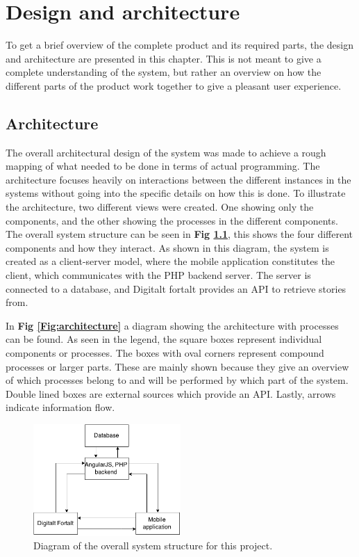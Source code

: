 
\chapter{Design and architecture}

To get a brief overview of the complete product and its required parts, the design and architecture are presented in this chapter. This is not meant to give a complete understanding of the system, but rather an overview on how the different parts of the product work together to give a pleasant user experience.

\section{Architecture}

The overall architectural design of the system was made to achieve a rough mapping of what needed to be done in terms of actual programming. The architecture focuses heavily on interactions between the different instances in the systems without going into the specific details on how this is done. To illustrate the architecture, two different views were created. One showing only the components, and the other showing the processes in the different components. The overall system structure can be seen in \textbf{Fig \ref{Fig:system_structure}}, this shows the four different components and how they interact. As shown in this diagram, the system is created as a client-server model, where the mobile application constitutes the client, which communicates with the PHP backend server. The server is connected to a database, and Digitalt fortalt provides an API to retrieve stories from.\newline

In \textbf{Fig \ref{Fig:architecture}} a diagram showing the architecture with processes can be found. As seen in the legend, the square boxes represent individual components or processes. The boxes with oval corners represent compound processes or larger parts. These are mainly shown because they give an overview of which processes belong to and will be performed by which part of the system. Double lined boxes are external sources which provide an API. Lastly, arrows indicate information flow.

\begin{figure}[h!]
	\centering
	\includegraphics[width=0.5\textwidth]{fig/system_structure}
	\caption{Diagram of the overall system structure for this project.}
	\label{Fig:system_structure}
\end{figure}

